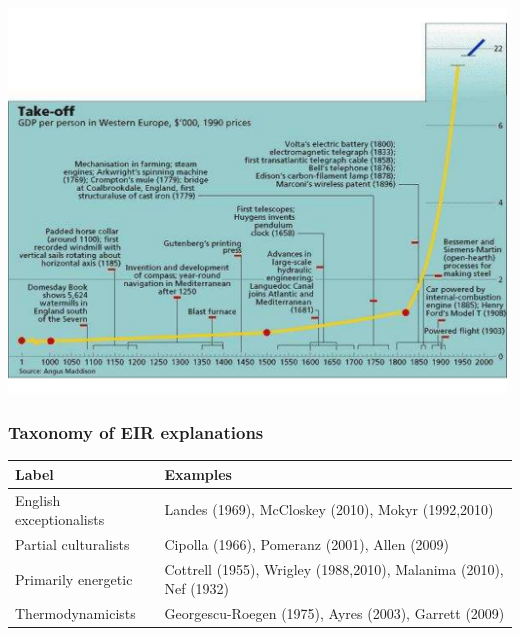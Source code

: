 \documentclass[final]{beamer}
\begin{document}
\begin{center}
\includegraphics[width=0.99\textwidth]{roadtoriches.pdf}
\end{center}

\begin{frame}
\frametitle{Taxonomy of EIR explanations}
\footnotesize{
\begin{table}[p!]
\label{tbl:taxonomy}
\scriptsize{
\begin{tabular}{ll}
Label&Examples\\
\hline \hline
English exceptionalists&Landes (1969), McCloskey (2010), Mokyr (1992,2010)\\
Partial culturalists&Cipolla (1966), Pomeranz (2001), Allen (2009)\\
Primarily energetic&Cottrell (1955), Wrigley (1988,2010), Malanima (2010), Nef (1932)\\
Thermodynamicists&Georgescu-Roegen (1975), Ayres (2003), Garrett (2009)\\
\end{tabular}
}
\end{table}
}
\end{frame}
\end{document}
